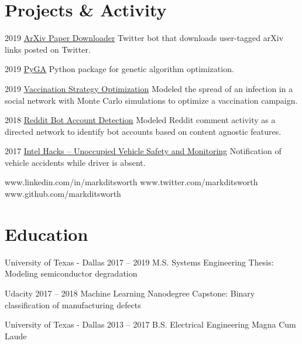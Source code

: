 \documentclass{tccv}
\begin{document}
\section{Projects \& Activity}
\begin{yearlist}
	
	\item{2019}
	{\href{https://github.com/markditsworth/PaperDownload}{ArXiv Paper Downloader}}
	{Twitter bot that downloads user-tagged arXiv links posted on Twitter.}
	
	\item{2019}
	{\href{https://github.com/markditsworth/PyGA}{PyGA}}
	{Python package for genetic algorithm optimization.}
	
	\item{2019}
	{\href{https://towardsdatascience.com/infection-modeling-part-1-87e74645568a}{Vaccination Strategy Optimization}}
	{Modeled the spread of an infection in a social network with Monte Carlo simulations to optimize a vaccination campaign.}
	
	\item{2018}
	{\href{https://chatbotslife.com/bot-detection-with-network-science-dde6525005f2}{Reddit Bot Account Detection}}
	{Modeled Reddit comment activity as a directed network to identify bot accounts based on content agnostic features.}
	
	\item{2017}
	{\href{https://devpost.com/software/unoccupied-vehicle-safety-and-monitoringg}{Intel Hacks -- Unoccupied Vehicle Safety and Monitoring}}
	{Notification of vehicle accidents while driver is absent.}
	
\end{yearlist}

    {www.linkedin.com/in/markditsworth}
    {www.twitter.com/markditsworth}
    {www.github.com/markditsworth}

\section{Education}

\begin{yearlist}

\item[University of Texas - Dallas]{2017 -- 2019}
     {M.S. Systems Engineering}
     {Thesis: Modeling semiconductor degradation}
     
\item[Udacity]{2017 -- 2018}
	 {Machine Learning Nanodegree}
	 {Capstone: Binary classification of manufacturing defects}

\item[University of Texas - Dallas]{2013 -- 2017}
     {B.S. Electrical Engineering}
     {Magna Cum Laude}

\end{yearlist}
\end{document}
